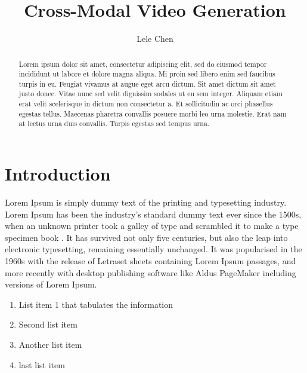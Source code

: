 \documentclass[11pt, fullpage]{article}
\begin{document}
\title{Cross-Modal Video Generation}
\author{Lele Chen}
    \cochairfalse
    \figurelisttrue
    \tablelistfalse
\makecoverpages


\begin{acknowledgements}
\end{acknowledgements}

\begin{abstract}
    \doublespacing
    Lorem ipsum dolor sit amet, consectetur adipiscing elit, sed do eiusmod tempor incididunt ut labore et dolore magna aliqua. Mi proin sed libero enim sed faucibus turpis in eu. Feugiat vivamus at augue eget arcu dictum. Sit amet dictum sit amet justo donec. Vitae nunc sed velit dignissim sodales ut eu sem integer. Aliquam etiam erat velit scelerisque in dictum non consectetur a. Et sollicitudin ac orci phasellus egestas tellus. Maecenas pharetra convallis posuere morbi leo urna molestie. Erat nam at lectus urna duis convallis. Turpis egestas sed tempus urna.
    \cleardoublepage
    \singlespacing
\end{abstract}

\copyrighttrue
\makecontentspages


\section[\bf \uppercase{Sample Introduction}]{Introduction}

Lorem Ipsum is simply dummy text of the printing and typesetting industry. Lorem Ipsum has been the industry's standard dummy text ever since the 1500s, when an unknown printer took a galley of type and scrambled it to make a type specimen book \cite{gridftp}. It has survived not only five centuries, but also the leap into electronic typesetting, remaining essentially unchanged. It was popularised in the 1960s with the release of Letraset sheets containing Lorem Ipsum passages, and more recently with desktop publishing software like Aldus PageMaker including versions of Lorem Ipsum.
\begin{enumerate}
\item
List item 1 that tabulates the information
\item
Second list item
\item
Another list item
\item
last list item
\end{enumerate}
\end{document}
